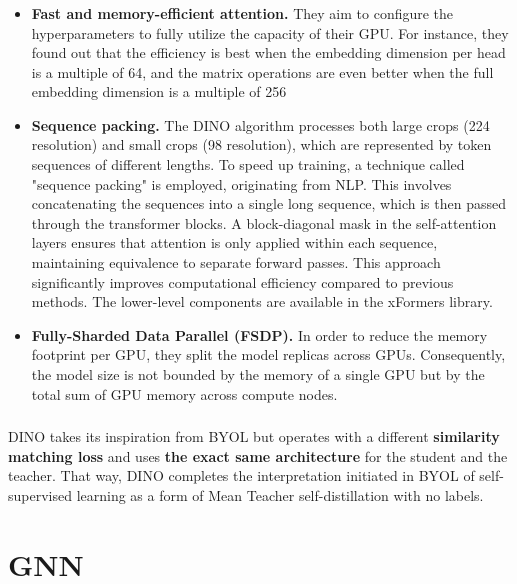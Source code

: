 \documentclass{article}
\begin{document}
\subsubsection{}
\begin{itemize}
    \item \textbf{Fast and memory-efficient attention.} They aim to configure the hyperparameters to
    fully utilize the capacity of their GPU. For instance, 
    they found out that the efficiency is best when the embedding dimension per head is a multiple of
    64, and the matrix operations are even better when the full embedding dimension is a multiple of 256
    \item \textbf{Sequence packing.} The DINO algorithm processes both large crops (224 resolution) and 
    small crops (98 resolution), which are represented by token sequences of different lengths. 
    To speed up training, a technique called "sequence packing" is employed, originating from NLP. 
    This involves concatenating the sequences into a single long sequence, which is then passed through the transformer blocks. 
    A block-diagonal mask in the self-attention layers ensures that attention is only applied within each sequence, 
    maintaining equivalence to separate forward passes. This approach significantly improves computational efficiency compared to previous methods.
    The lower-level components are available in the xFormers library.
    \item \textbf{Fully-Sharded Data Parallel (FSDP).} In order to reduce the
    memory footprint per GPU, they split the model replicas across GPUs. 
    Consequently, the model size is not bounded by the memory of
    a single GPU but by the total sum of GPU memory across compute nodes.
\end{itemize}
\subsubsection{}
DINO takes its inspiration from 
BYOL but operates with a different \textbf{similarity matching loss} 
and uses \textbf{the exact same architecture} for the student and the
teacher. That way, DINO completes the interpretation
initiated in BYOL of self-supervised learning as a form of
Mean Teacher self-distillation with no labels.



\section{GNN}
\end{document}
